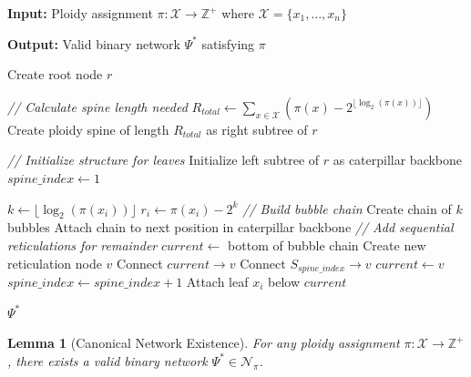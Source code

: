 \documentclass{article}
\newtheorem{lemma}[theorem]{Lemma}
\begin{document}
\begin{algorithm}[H]
\caption{ConstructCanonicalNetwork}\label{alg:canonical}
\textbf{Input:} Ploidy assignment $\pi: \mathcal{X} \rightarrow \mathbb{Z}^+$ where $\mathcal{X} = \{x_1, \ldots, x_n\}$

\textbf{Output:} Valid binary network $\Psi^*$ satisfying $\pi$

\begin{algorithmic}[1]
        \State Create root node $r$
        
        \State \textit{// Calculate spine length needed}
        \State $R_{total} \gets \sum_{x \in \mathcal{X}} \left( \pi(x) - 2^{\lfloor \log_2(\pi(x)) \rfloor} \right)$ 
        \State Create ploidy spine of length $R_{total}$ as right subtree of $r$
        
        \State \textit{// Initialize structure for leaves}
        \State Initialize left subtree of $r$ as caterpillar backbone
        \State $spine\_index \gets 1$
        
            \State $k \gets \lfloor \log_2(\pi(x_i)) \rfloor$ 
            \State $r_i \gets \pi(x_i) - 2^k$ 
            \State 
            \State \textit{// Build bubble chain}
            \State Create chain of $k$ bubbles
            \State Attach chain to next position in caterpillar backbone
            \State
            \State \textit{// Add sequential reticulations for remainder}
            \State $current \gets$ bottom of bubble chain
                \State Create new reticulation node $v$
                \State Connect $current \to v$
                \State Connect $S_{spine\_index} \to v$ 
                \State $current \gets v$
                \State $spine\_index \gets spine\_index + 1$
            \EndFor
            \State
            \State Attach leaf $x_i$ below $current$
        \EndFor
        
        \State \Return $\Psi^*$
    \EndProcedure
\end{algorithmic}
\end{algorithm}

\begin{lemma}[Canonical Network Existence]\label{lem:existence}
For any ploidy assignment $\pi: \mathcal{X} \rightarrow \mathbb{Z}^+$, there exists a valid binary network $\Psi^* \in \mathcal{N}_\pi$.
\end{lemma}
\end{document}
